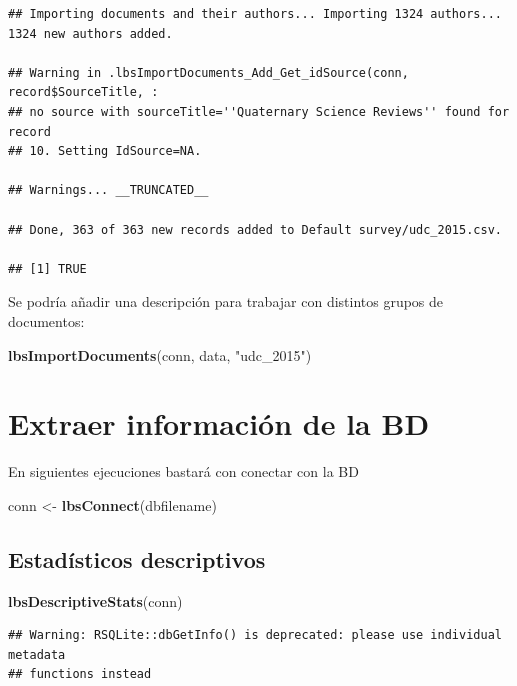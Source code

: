 \documentclass[]{book}
\newenvironment{Shaded}{\begin{snugshade}}{\end{snugshade}}
\newcommand{\KeywordTok}[1]{\textcolor[rgb]{0.13,0.29,0.53}{\textbf{#1}}}
\newcommand{\StringTok}[1]{\textcolor[rgb]{0.31,0.60,0.02}{#1}}
\newcommand{\NormalTok}[1]{#1}
\begin{document}
\begin{verbatim}
## Importing documents and their authors... Importing 1324 authors... 1324 new authors added.

## Warning in .lbsImportDocuments_Add_Get_idSource(conn, record$SourceTitle, :
## no source with sourceTitle=''Quaternary Science Reviews'' found for record
## 10. Setting IdSource=NA.

## Warnings... __TRUNCATED__

## Done, 363 of 363 new records added to Default survey/udc_2015.csv.

## [1] TRUE
\end{verbatim}

Se podría añadir una descripción para trabajar con distintos grupos de
documentos:

\begin{Shaded}
\begin{Highlighting}[]
\KeywordTok{lbsImportDocuments}\NormalTok{(conn, data, }\StringTok{"udc_2015"}\NormalTok{) }
\end{Highlighting}
\end{Shaded}

\section{Extraer información de la
BD}\label{extraer-informacion-de-la-bd}

En siguientes ejecuciones bastará con conectar con la BD

\begin{Shaded}
\begin{Highlighting}[]
\NormalTok{conn <-}\StringTok{ }\KeywordTok{lbsConnect}\NormalTok{(dbfilename)}
\end{Highlighting}
\end{Shaded}

\subsection{Estadísticos descriptivos}\label{estadisticos-descriptivos}

\begin{Shaded}
\begin{Highlighting}[]
\KeywordTok{lbsDescriptiveStats}\NormalTok{(conn)}
\end{Highlighting}
\end{Shaded}

\begin{verbatim}
## Warning: RSQLite::dbGetInfo() is deprecated: please use individual metadata
## functions instead
\end{verbatim}
\end{document}
